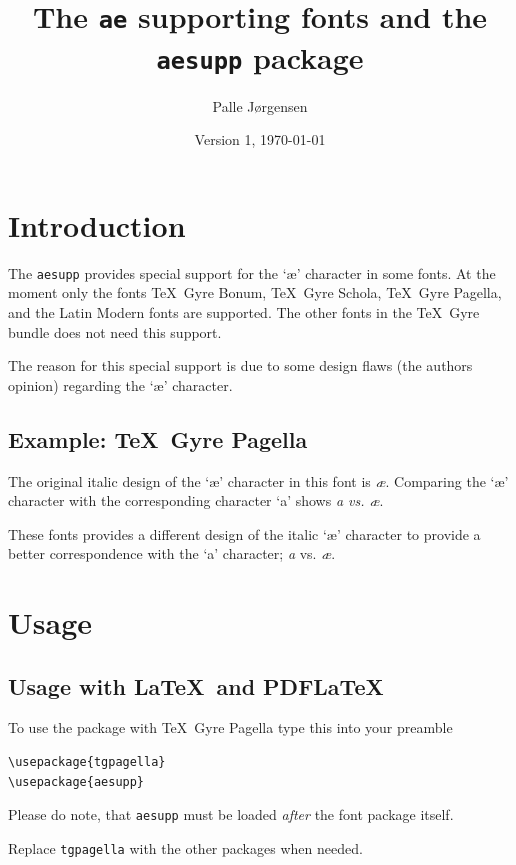 \documentclass[paper=a4,11pt,english,parskip=half]{scrartcl}
\title{The \texttt{ae} supporting fonts and the \texttt{aesupp}
  package} \author{Palle Jørgensen} \date{Version 1, \today}
\begin{document}
\maketitle
\tableofcontents

\section{Introduction}


The \texttt{aesupp} provides special support for the `æ' character in
some fonts. At the moment only the fonts \TeX\ Gyre Bonum, \TeX\ Gyre
Schola, \TeX\ Gyre Pagella, and the Latin Modern fonts are supported.
The other fonts in the \TeX\ Gyre bundle does not need this support.

The reason for this special support is due to some design flaws (the
authors opinion) regarding the `æ' character.


\subsection{Example: \TeX\ Gyre Pagella}
\label{sec:example:-tex-gyre}

The original italic design of the `æ' character in this font is
{\itshape æ}. Comparing the `æ' character with the
corresponding character `a' shows {\itshape a
  \textup{vs.} æ}.

These fonts provides a different design of the italic `æ' character to
provide a better correspondence with the `a' character; \textit{a} vs.
\textit{æ}.

\section{Usage}
\label{sec:usage}

\subsection{Usage with \LaTeX\ and PDF\LaTeX}
\label{sec:usage-with-latex}

To use the package with \TeX\ Gyre Pagella type this into your preamble
\begin{lstlisting}
\usepackage{tgpagella}
\usepackage{aesupp}
\end{lstlisting}
Please do note, that \texttt{aesupp} must be loaded \emph{after} the
font package itself.

Replace \texttt{tgpagella} with the other packages when needed.
\end{document}
